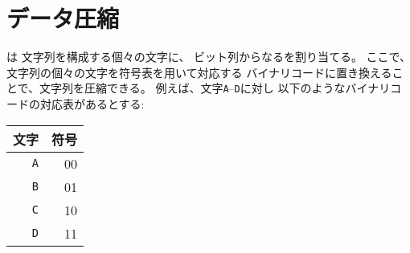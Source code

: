\begin{comment}
\section{Data compression}

\index{data compression}
\index{binary code}
\index{codeword}

A \key{binary code} assigns for each character
of a string a \key{codeword} that consists of bits.
We can \emph{compress} the string using the binary code
by replacing each character by the
corresponding codeword.
For example, the following binary code
assigns codewords for characters
\texttt{A}–\texttt{D}:
\begin{center}
\begin{tabular}{rr}
character & codeword \\
\hline
\texttt{A} & 00 \\
\texttt{B} & 01 \\
\texttt{C} & 10 \\
\texttt{D} & 11 \\
\end{tabular}
\end{center}
\end{comment}

\section{データ圧縮}



は 文字列を構成する個々の文字に、
ビット列からなるを割り当てる。
ここで、文字列の個々の文字を符号表を用いて対応する
バイナリコードに置き換えることで、文字列を圧縮できる。
例えば、文字\texttt{A}–\texttt{D}に対し
以下のようなバイナリコードの対応表があるとする:
\begin{center}
\begin{tabular}{rr}
文字 & 符号 \\
\hline
\texttt{A} & 00 \\
\texttt{B} & 01 \\
\texttt{C} & 10 \\
\texttt{D} & 11 \\
\end{tabular}
\end{center}

